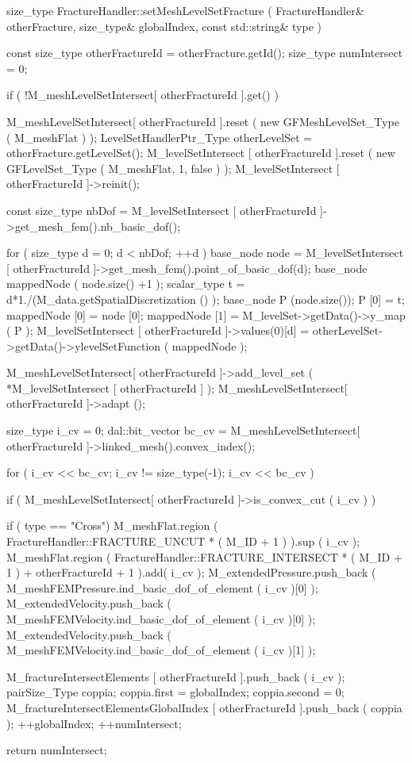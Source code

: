 \begin{Code}[caption={Funzione \texttt{setMeshLevelSetFracture}}]
size_type FractureHandler::setMeshLevelSetFracture (
FractureHandler& otherFracture, size_type& globalIndex, const std::string& type )
{	
    const size_type otherFractureId = otherFracture.getId();
    size_type numIntersect = 0;
    
    if ( !M_meshLevelSetIntersect[ otherFractureId ].get() )
    {
        M_meshLevelSetIntersect[ otherFractureId ].reset ( new GFMeshLevelSet_Type ( M_meshFlat ) );
        LevelSetHandlerPtr_Type otherLevelSet = otherFracture.getLevelSet();
        M_levelSetIntersect [ otherFractureId ].reset ( new GFLevelSet_Type ( M_meshFlat, 1, false )  );
        M_levelSetIntersect [ otherFractureId ]->reinit();

        const size_type nbDof = M_levelSetIntersect [ otherFractureId ]->get_mesh_fem().nb_basic_dof();

        for ( size_type d = 0; d < nbDof; ++d )
        {
            base_node node = M_levelSetIntersect [ otherFractureId ]->get_mesh_fem().point_of_basic_dof(d);
            base_node mappedNode ( node.size() +1 );
	  scalar_type t = d*1./(M_data.getSpatialDiscretization () );
	  base_node P (node.size());
	  P [0] = t;
           mappedNode [0] = node [0];
           mappedNode [1] = M_levelSet->getData()->y_map ( P );
	  M_levelSetIntersect [ otherFractureId ]->values(0)[d] = otherLevelSet->getData()->ylevelSetFunction ( mappedNode );
        }

        M_meshLevelSetIntersect[ otherFractureId ]->add_level_set ( *M_levelSetIntersect [ otherFractureId ] );
        M_meshLevelSetIntersect[ otherFractureId ]->adapt ();

        size_type i_cv = 0;
        dal::bit_vector bc_cv = M_meshLevelSetIntersect[ otherFractureId ]->linked_mesh().convex_index();
		
        for ( i_cv << bc_cv; i_cv != size_type(-1); i_cv << bc_cv )
        {
            if ( M_meshLevelSetIntersect[ otherFractureId ]->is_convex_cut ( i_cv ) )
            {  
            	if ( type == "Cross")
            	{	
			M_meshFlat.region ( FractureHandler::FRACTURE_UNCUT * ( M_ID + 1 ) ).sup ( i_cv );
			M_meshFlat.region ( FractureHandler::FRACTURE_INTERSECT * ( M_ID + 1 ) + otherFractureId + 1 ).add( i_cv );
			M_extendedPressure.push_back ( M_meshFEMPressure.ind_basic_dof_of_element ( i_cv )[0] );
			M_extendedVelocity.push_back ( M_meshFEMVelocity.ind_basic_dof_of_element ( i_cv )[0] );
			M_extendedVelocity.push_back ( M_meshFEMVelocity.ind_basic_dof_of_element ( i_cv )[1] );
            	}
            	
		M_fractureIntersectElements [ otherFractureId ].push_back ( i_cv );
		pairSize_Type coppia;
		coppia.first = globalIndex;
		coppia.second = 0;
		M_fractureIntersectElementsGlobalIndex [ otherFractureId ].push_back ( coppia );
		++globalIndex;
		++numIntersect;
	          }
        }
    }

    return numIntersect;
}
\end{Code}

